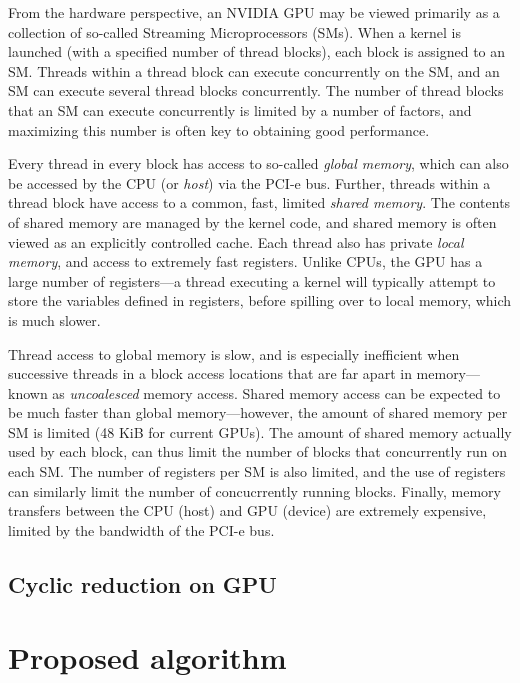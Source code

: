 \documentclass{elsarticle}
\begin{document}
From the hardware perspective, an NVIDIA GPU may be viewed primarily as
a collection of so-called Streaming Microprocessors (SMs).
When a kernel is launched (with a specified number of thread blocks),
each block is assigned to an SM.
Threads within a thread block can execute concurrently on the SM,
and an SM can execute several thread blocks concurrently.
The number of thread blocks that an SM can execute concurrently
is limited by a number of factors,
and maximizing this number is often key to obtaining good performance.

Every thread in every block has access to so-called \emph{global memory},
which can also be accessed by the CPU (or \emph{host}) via the PCI-e bus.
Further,
threads within a thread block have access
to a common, fast, limited \emph{shared memory}.
The contents of shared memory are managed by the kernel code,
and shared memory is often viewed as an explicitly controlled cache.
Each thread also has private \emph{local memory},
and access to extremely fast registers.
Unlike CPUs, the GPU has a large number of registers---a
thread executing a kernel will
typically attempt to store the variables defined in registers,
before spilling over to local memory, which is much slower.

Thread access to global memory is slow,
and is especially inefficient when
successive threads in a block
access locations that are far apart in memory---known
as \emph{uncoalesced} memory access.
Shared memory access can be expected to be
much faster than global memory---however,
the amount of shared memory per SM is limited
(48 KiB for current GPUs).
The amount of shared memory actually used by each block,
can thus limit the number of blocks that concurrently run on each SM.
The number of registers per SM is also limited,
and the use of registers can similarly limit
the number of concucrrently running blocks.
Finally, memory transfers between the CPU (host) and GPU (device)
are extremely expensive, limited by the bandwidth of the PCI-e bus.

\subsection{Cyclic reduction on GPU}




\section{Proposed algorithm} \label{sec:proposed-algorithm}
\end{document}
